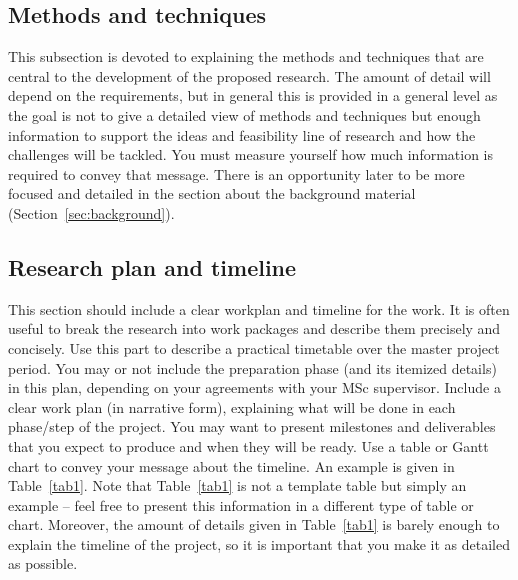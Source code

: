 \documentclass{article}
\begin{document}
\subsection{Methods and techniques}

This subsection is devoted to explaining the methods and techniques that are central to the development of the proposed research. The amount of detail will depend on the requirements, but in general this is provided in a general level as the goal is not to give a detailed view of methods and techniques but enough information to support the ideas and feasibility line of research and how the challenges will be tackled. You must measure yourself how much information is required to convey that message. There is an opportunity later to be more focused and detailed in the section about the background material (Section~\ref{sec:background}).

\subsection{Research plan and timeline}
This section should include a clear workplan and timeline for the work. It is often useful to break the research into work packages and describe them precisely and concisely. Use this part to describe a practical timetable over the master project period. You may or not include the preparation phase (and its itemized details) in this plan, depending on your agreements with your MSc supervisor. Include a clear work plan (in narrative form), explaining what will be done in each phase/step of the project. You may want to present milestones and deliverables that you expect to produce and when they will be ready. Use a table or Gantt chart to convey your message about the timeline. An example is given in Table~\ref{tab1}. Note that Table~\ref{tab1} is not a template table but simply an example -- feel free to present this information in a different type of table or chart. Moreover, the amount of details given in Table~\ref{tab1} is barely enough to explain the timeline of the project, so it is important that you make it as detailed as possible.
\end{document}
